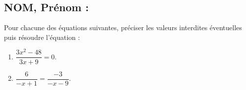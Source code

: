 \documentclass[a4paper,11pt,exos]{nsi}
\begin{document}
\subsection*{NOM, Prénom : \dotfill} 


\maketitle



\begin{exercice}
    Pour chacune des équations suivantes, préciser les valeurs interdites éventuelles puis résoudre l'équation :
    \begin{multicols}{2}
        \begin{enumerate}
	        \item $\dfrac{3x^2-48}{3x+9}=0$.
	        \item  $\dfrac{6}{-x+1}=\dfrac{-3}{-x-9}$.
        \end{enumerate}
    \end{multicols}
    
\end{exercice}

\end{document}
